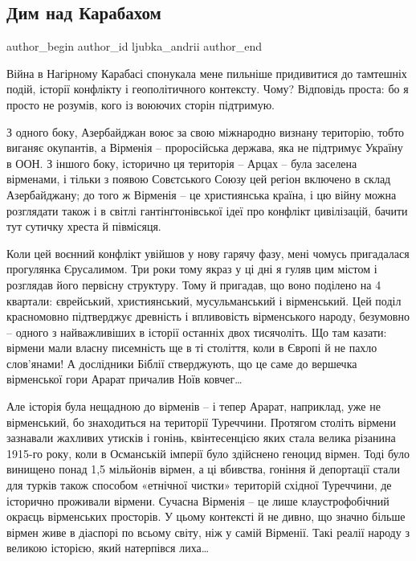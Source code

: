 
 
 
 
 
 
\subsection{Дим над Карабахом}
\label{sec:04_12_2020..ljubka_andrii.1.dym_nad_karabahom}
\ifcmt
	author_begin
   author_id ljubka_andrii
	author_end
\fi

Війна в Нагірному Карабасі спонукала мене пильніше придивитися до тамтешніх
подій, історії конфлікту і геополітичного контексту. Чому? Відповідь проста: бо
я просто не розумів, кого із воюючих сторін підтримую.

З одного боку, Азербайджан воює за свою міжнародно визнану територію, тобто
виганяє окупантів, а Вірменія – проросійська держава, яка не підтримує Україну
в ООН. З іншого боку, історично ця територія – Арцах – була заселена вірменами,
і тільки з появою Совєтського Союзу цей регіон включено в склад Азербайджану;
до того ж Вірменія – це християнська країна, і цю війну можна розглядати також
і в світлі гантінґтонівської ідеї про конфлікт цивілізацій, бачити тут сутичку
хреста й півмісяця.

Коли цей воєнний конфлікт увійшов у нову гарячу фазу, мені чомусь пригадалася
прогулянка Єрусалимом. Три роки тому якраз у ці дні я гуляв цим містом і
розглядав його первісну структуру. Тому й пригадав, що воно поділено на 4
квартали: єврейський, християнський, мусульманський і вірменський. Цей поділ
красномовно підтверджує древність і впливовість вірменського народу, безумовно
– одного з найважливіших в історії останніх двох тисячоліть. Що там казати:
вірмени мали власну писемність ще в ті століття, коли в Європі й не пахло
слов’янами! А дослідники Біблії стверджують, що це саме до вершечка вірменської
гори Арарат причалив Ноїв ковчег…

Але історія була нещадною до вірменів – і тепер Арарат, наприклад, уже не
вірменський, бо знаходиться на території Туреччини. Протягом століть вірмени
зазнавали жахливих утисків і гонінь, квінтесенцією яких стала велика різанина
1915-го року, коли в Османській імперії було здійснено геноцид вірмен. Тоді
було винищено понад 1,5 мільйонів вірмен, а ці вбивства, гоніння й депортації
стали для турків також способом «етнічної чистки» територій східної Туреччини,
де історично проживали вірмени. Сучасна Вірменія – це лише клаустрофобічний
окраєць вірменських просторів. У цьому контексті й не дивно, що значно більше
вірмен живе в діаспорі по всьому світу, ніж у самій Вірменії. Такі реалії
народу з великою історією, який натерпівся лиха…

